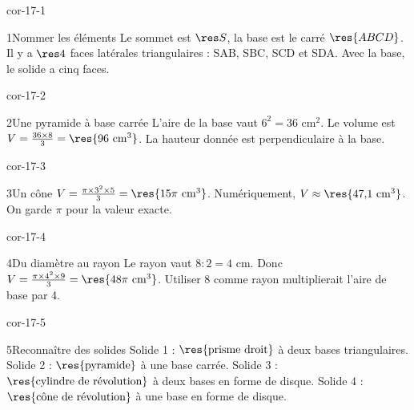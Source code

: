 \clearpage\pagestyle{otMain}\setlength{\otBlocEspacement}{2.5mm}\fontsize{11}{15}\selectfont{}
\begin{blocLivre}{cor-17-1}\begin{corrige}{1}{Nommer les éléments}
Le sommet est $\res S$, la base est le carré $\res{ABCD}$. Il y a $\res4$ faces latérales triangulaires : SAB, SBC, SCD et SDA. Avec la base, le solide a cinq faces.
\label{fig-cor-17-1}
\end{corrige}\end{blocLivre}
\begin{blocLivre}{cor-17-2}\begin{corrige}{2}{Une pyramide à base carrée}
L’aire de la base vaut $6^2=36$ cm$^2$. Le volume est $V=\frac{36\times8}3=\res{96\ \mathrm{cm}^3}$. La hauteur donnée est perpendiculaire à la base.
\label{fig-cor-17-2}
\end{corrige}\end{blocLivre}
\begin{blocLivre}{cor-17-3}\begin{corrige}{3}{Un cône}
$V=\frac{\pi\times3^2\times5}3=\res{15\pi\ \mathrm{cm}^3}$. Numériquement, $V\approx\res{47{,}1\ \mathrm{cm}^3}$. On garde $\pi$ pour la valeur exacte.
\label{fig-cor-17-3}
\end{corrige}\end{blocLivre}
\begin{blocLivre}{cor-17-4}\begin{corrige}{4}{Du diamètre au rayon}
Le rayon vaut $8:2=4$ cm. Donc $V=\frac{\pi\times4^2\times9}3=\res{48\pi\ \mathrm{cm}^3}$. Utiliser 8 comme rayon multiplierait l’aire de base par 4.
\label{fig-cor-17-4}
\end{corrige}\end{blocLivre}
\begin{blocLivre}{cor-17-5}\begin{corrige}{5}{Reconnaître des solides}
Solide 1 : $\res{\text{prisme droit}}$ à deux bases triangulaires. Solide 2 : $\res{\text{pyramide}}$ à une base carrée. Solide 3 : $\res{\text{cylindre de révolution}}$ à deux bases en forme de disque. Solide 4 : $\res{\text{cône de révolution}}$ à une base en forme de disque.
\label{fig-cor-17-5}
\end{corrige}\end{blocLivre}

